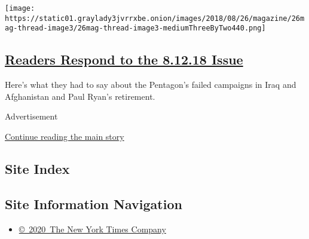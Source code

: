 \begin{enumerate}
  \texttt{[image: https://static01.graylady3jvrrxbe.onion/images/2018/08/26/magazine/26mag-thread-image3/26mag-thread-image3-mediumThreeByTwo440.png]}

  \hypertarget{readers-respond-to-the-81218-issue}{%
  \subsection{\texorpdfstring{\href{/2018/08/23/magazine/readers-respond-to-the-8-12-18-issue.html}{Readers
  Respond to the 8.12.18
  Issue}}{Readers Respond to the 8.12.18 Issue}}\label{readers-respond-to-the-81218-issue}}

  Here's what they had to say about the Pentagon's failed campaigns in
  Iraq and Afghanistan and Paul Ryan's retirement.
\end{enumerate}

Advertisement

\protect\hyperlink{after-mid1}{Continue reading the main story}

\hypertarget{site-index}{%
\subsection{Site Index}\label{site-index}}

\hypertarget{site-information-navigation}{%
\subsection{Site Information
Navigation}\label{site-information-navigation}}

\begin{itemize}
\tightlist
\item
  \href{https://help.nytimes3xbfgragh.onion/hc/en-us/articles/115014792127-Copyright-notice}{©~2020~The
  New York Times Company}
\end{itemize}

